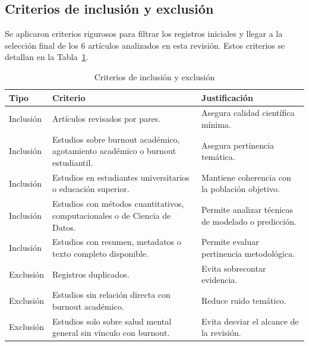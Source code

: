 \documentclass[12pt,a4paper]{article}
\renewcommand{\arraystretch}{1.12}
\begin{document}
\subsection{Criterios de inclusión y exclusión}

Se aplicaron criterios rigurosos para filtrar los registros iniciales y llegar a la selección
final de los 6 artículos analizados en esta revisión. Estos criterios se detallan en la Tabla~\ref{tab:criterios_inclusion_exclusion}.

\begin{table}[htbp]
\centering
\caption{Criterios de inclusión y exclusión}
\label{tab:criterios_inclusion_exclusion}
\renewcommand{\arraystretch}{1.15}
\small

\begin{tabularx}{\textwidth}{|
>{\raggedright\arraybackslash}p{2.3cm}|
>{\raggedright\arraybackslash}X|
>{\raggedright\arraybackslash}X|}
\hline
\textbf{Tipo} & \textbf{Criterio} & \textbf{Justificación} \\
\hline

Inclusión &
Artículos revisados por pares. &
Asegura calidad científica mínima. \\
\hline

Inclusión &
Estudios sobre burnout académico, agotamiento académico o burnout estudiantil. &
Asegura pertinencia temática. \\
\hline

Inclusión &
Estudios en estudiantes universitarios o educación superior. &
Mantiene coherencia con la población objetivo. \\
\hline

Inclusión &
Estudios con métodos cuantitativos, computacionales o de Ciencia de Datos. &
Permite analizar técnicas de modelado o predicción. \\
\hline

Inclusión &
Estudios con resumen, metadatos o texto completo disponible. &
Permite evaluar pertinencia metodológica. \\
\hline

Exclusión &
Registros duplicados. &
Evita sobrecontar evidencia. \\
\hline

Exclusión &
Estudios sin relación directa con burnout académico. &
Reduce ruido temático. \\
\hline

Exclusión &
Estudios solo sobre salud mental general sin vínculo con burnout. &
Evita desviar el alcance de la revisión. \\
\hline


\end{tabularx}
\end{table}
\end{document}
